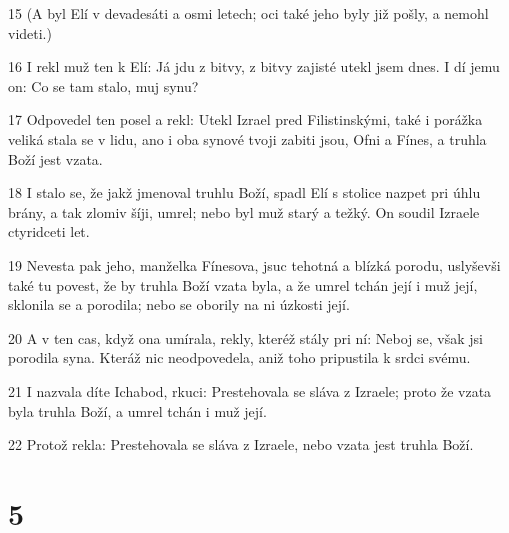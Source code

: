 \par 15 (A byl Elí v devadesáti a osmi letech; oci také jeho byly již pošly, a nemohl videti.)
\par 16 I rekl muž ten k Elí: Já jdu z bitvy, z bitvy zajisté utekl jsem dnes. I dí jemu on: Co se tam stalo, muj synu?
\par 17 Odpovedel ten posel a rekl: Utekl Izrael pred Filistinskými, také i porážka veliká stala se v lidu, ano i oba synové tvoji zabiti jsou, Ofni a Fínes, a truhla Boží jest vzata.
\par 18 I stalo se, že jakž jmenoval truhlu Boží, spadl Elí s stolice nazpet pri úhlu brány, a tak zlomiv šíji, umrel; nebo byl muž starý a težký. On soudil Izraele ctyridceti let.
\par 19 Nevesta pak jeho, manželka Fínesova, jsuc tehotná a blízká porodu, uslyševši také tu povest, že by truhla Boží vzata byla, a že umrel tchán její i muž její, sklonila se a porodila; nebo se oborily na ni úzkosti její.
\par 20 A v ten cas, když ona umírala, rekly, kteréž stály pri ní: Neboj se, však jsi porodila syna. Kteráž nic neodpovedela, aniž toho pripustila k srdci svému.
\par 21 I nazvala díte Ichabod, rkuci: Prestehovala se sláva z Izraele; proto že vzata byla truhla Boží, a umrel tchán i muž její.
\par 22 Protož rekla: Prestehovala se sláva z Izraele, nebo vzata jest truhla Boží.

\chapter{5}

